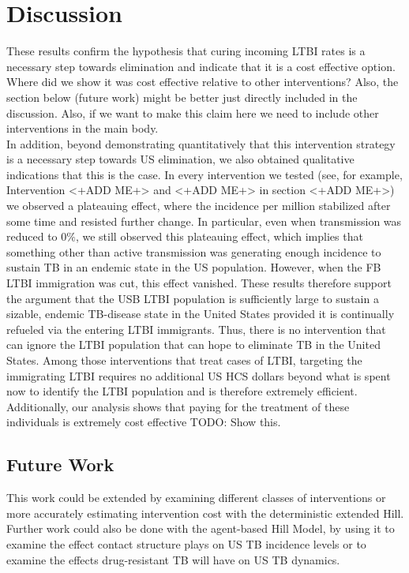 \documentclass{amsart}
\begin{document}
\section{Discussion}
These results confirm the hypothesis that curing incoming LTBI rates is a
necessary step towards elimination and indicate that it is a cost effective
option. \\
{\huge \color{red} Where did we show it was cost effective relative to other
interventions? Also, the section below (future work) might be better just
directly included in the discussion. Also, if we want to make this claim here we
need to include other interventions in the main body.}\\
In addition, beyond demonstrating quantitatively that this intervention strategy
is a necessary step towards US elimination, we also obtained qualitative
indications that this is the case. In every intervention we tested (see, for
example, Intervention <+ADD ME+> and <+ADD ME+> in section <+ADD ME+>) we
observed a plateauing effect, where the incidence per million stabilized after
some time and resisted further change. In particular, even when transmission was
reduced to $0\%$, we still observed this plateauing effect, which implies that
something other than active transmission was generating enough incidence to
sustain TB in an endemic state in the US population. However, when the FB LTBI
immigration was cut, this effect vanished. These results therefore support the
argument that the USB LTBI population is sufficiently large to sustain a
sizable, endemic TB-disease state in the United States provided it is
continually refueled via the entering LTBI immigrants. Thus, there is no
intervention that can ignore the LTBI population that can hope to eliminate TB
in the United States. Among those interventions that treat cases of LTBI,
targeting the immigrating LTBI requires no additional US HCS dollars beyond what
is spent now to identify the LTBI population and is therefore extremely
efficient. Additionally, our analysis shows that paying for the treatment of
these individuals is extremely cost effective {\huge \color{red} TODO: Show
this}.
\subsection{Future Work}
This work could be extended by examining different classes of interventions or
more accurately estimating intervention cost with the deterministic extended
Hill. Further work could also be done with the agent-based Hill Model, by using
it to examine the effect contact structure plays on US TB incidence levels or to
examine the effects drug-resistant TB will have on US TB dynamics. 
\end{document}
